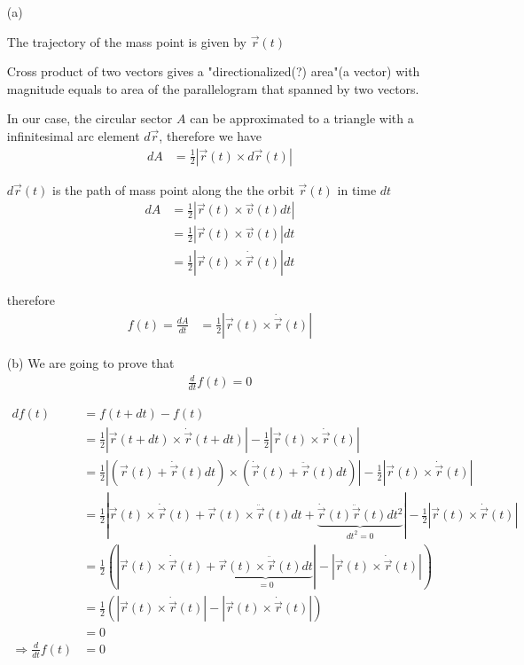 \documentclass[11pt,a4paper]{article}
\begin{document}
\begin{enumerate}

\item[(a)]

The trajectory of the mass point is given by $\vec{r}(t)$

Cross product of two vectors gives a "directionalized(?) area"(a vector) with magnitude equals to area of the parallelogram that spanned by two vectors.

In our case, the circular sector $A$ can be approximated to a triangle with a  infinitesimal arc element $d\vec{r}$, therefore we have
\begin{align*}
dA
&=\frac{1}{2}|\vec{r}(t)\times d\vec{r}(t)|
\end{align*}

$d\vec{r}(t)$ is the path of mass point along the the orbit $\vec{r}(t)$ in time $dt$
\begin{align*}
dA
&=\frac{1}{2}|\vec{r}(t)\times \vec{v}(t)dt| \\
&=\frac{1}{2}|\vec{r}(t)\times \vec{v}(t)|dt \\
&=\frac{1}{2}|\vec{r}(t)\times \dot{\vec{r}}(t)|dt
\end{align*}

therefore
\begin{align*}
f(t)=\frac{dA}{dt}
&=\frac{1}{2}|\vec{r}(t)\times \dot{\vec{r}}(t)|
\end{align*}

\item[(b)]
 We are going to prove that 
\begin{align*}
\frac{d}{dt}f(t)=0
\end{align*}

\begin{align*}
df(t)
&=f(t+dt)-f(t) \\
&=\frac{1}{2}|\vec{r}(t+dt)\times\dot{\vec{r}}(t+dt)|-\frac{1}{2}|\vec{r}(t)\times \dot{\vec{r}}(t)| \\
&=\frac{1}{2}|(\vec{r}(t)+\dot{\vec{r}}(t)dt)\times(\dot{\vec{r}}(t)+\ddot{\vec{r}}(t)dt)|-\frac{1}{2}|\vec{r}(t)\times \dot{\vec{r}}(t)| \\
&=\frac{1}{2}|\vec{r}(t)\times\dot{\vec{r}}(t)+\vec{r}(t)\times\ddot{\vec{r}}(t)dt+\underset{dt^2=0}{\underbrace{\dot{\vec{r}}(t)\ddot{\vec{r}}(t)dt^2}}|-\frac{1}{2}|\vec{r}(t)\times \dot{\vec{r}}(t)| \\
&=\frac{1}{2}(|\vec{r}(t)\times\dot{\vec{r}}(t)+\underset{=0}{\underbrace{\vec{r}(t)\times\ddot{\vec{r}}(t)dt}}|-|\vec{r}(t)\times \dot{\vec{r}}(t)|) \\
&=\frac{1}{2}(|\vec{r}(t)\times \dot{\vec{r}}(t)|-|\vec{r}(t)\times \dot{\vec{r}}(t)|) \\
&=0 \\
\Rightarrow\frac{d}{dt}f(t)&=0
\end{align*}


\end{enumerate}
\end{document}
